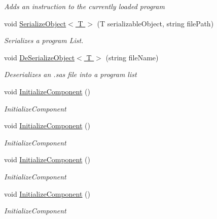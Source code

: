 \begin{DoxyCompactItemize}
\begin{DoxyCompactList}\small\item\em Adds an instruction to the currently loaded program \end{DoxyCompactList}\item 
void \hyperlink{class_c_p_u___o_s___simulator_1_1_main_window_a80985670e45349866a463b766f92e27b}{Serialize\+Object$<$ T $>$} (T serializable\+Object, string file\+Path)
\begin{DoxyCompactList}\small\item\em Serializes a program List. \end{DoxyCompactList}\item 
void \hyperlink{class_c_p_u___o_s___simulator_1_1_main_window_a44e09f35524cd53ddab77488989c5833}{De\+Serialize\+Object$<$ T $>$} (string file\+Name)
\begin{DoxyCompactList}\small\item\em Deserializes an .sas file into a program list \end{DoxyCompactList}\item 
void \hyperlink{class_c_p_u___o_s___simulator_1_1_main_window_a30724af44ae89c2172130c2dd36e145c}{Initialize\+Component} ()
\begin{DoxyCompactList}\small\item\em Initialize\+Component \end{DoxyCompactList}\item 
void \hyperlink{class_c_p_u___o_s___simulator_1_1_main_window_a30724af44ae89c2172130c2dd36e145c}{Initialize\+Component} ()
\begin{DoxyCompactList}\small\item\em Initialize\+Component \end{DoxyCompactList}\item 
void \hyperlink{class_c_p_u___o_s___simulator_1_1_main_window_a30724af44ae89c2172130c2dd36e145c}{Initialize\+Component} ()
\begin{DoxyCompactList}\small\item\em Initialize\+Component \end{DoxyCompactList}\item 
void \hyperlink{class_c_p_u___o_s___simulator_1_1_main_window_a30724af44ae89c2172130c2dd36e145c}{Initialize\+Component} ()
\begin{DoxyCompactList}\small\item\em Initialize\+Component \end{DoxyCompactList}\end{DoxyCompactItemize}
